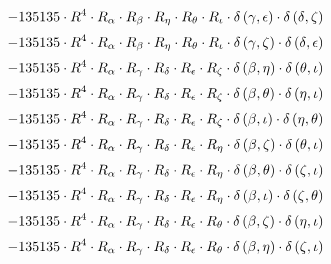 \begin{subequations}
\begin{gather}
 \\[0.2em] \notag 		 - 135135 \cdot R^{4} \cdot R_{\alpha{}} \cdot R_{\beta{}} \cdot R_{\eta{}} \cdot R_{\theta{}} \cdot R_{\iota{}} \cdot \delta{}\left(\gamma{}, \epsilon{}\right) \cdot \delta{}\left(\delta{}, \zeta{}\right) 
 \\[0.2em] \notag 		 - 135135 \cdot R^{4} \cdot R_{\alpha{}} \cdot R_{\beta{}} \cdot R_{\eta{}} \cdot R_{\theta{}} \cdot R_{\iota{}} \cdot \delta{}\left(\gamma{}, \zeta{}\right) \cdot \delta{}\left(\delta{}, \epsilon{}\right) 
 \\[0.2em] \notag 		 - 135135 \cdot R^{4} \cdot R_{\alpha{}} \cdot R_{\gamma{}} \cdot R_{\delta{}} \cdot R_{\epsilon{}} \cdot R_{\zeta{}} \cdot \delta{}\left(\beta{}, \eta{}\right) \cdot \delta{}\left(\theta{}, \iota{}\right) 
 \\[0.2em] \notag 		 - 135135 \cdot R^{4} \cdot R_{\alpha{}} \cdot R_{\gamma{}} \cdot R_{\delta{}} \cdot R_{\epsilon{}} \cdot R_{\zeta{}} \cdot \delta{}\left(\beta{}, \theta{}\right) \cdot \delta{}\left(\eta{}, \iota{}\right) 
 \\[0.2em] \notag 		 - 135135 \cdot R^{4} \cdot R_{\alpha{}} \cdot R_{\gamma{}} \cdot R_{\delta{}} \cdot R_{\epsilon{}} \cdot R_{\zeta{}} \cdot \delta{}\left(\beta{}, \iota{}\right) \cdot \delta{}\left(\eta{}, \theta{}\right) 
 \\[0.2em] \notag 		 - 135135 \cdot R^{4} \cdot R_{\alpha{}} \cdot R_{\gamma{}} \cdot R_{\delta{}} \cdot R_{\epsilon{}} \cdot R_{\eta{}} \cdot \delta{}\left(\beta{}, \zeta{}\right) \cdot \delta{}\left(\theta{}, \iota{}\right) 
 \\[0.2em] \notag 		 - 135135 \cdot R^{4} \cdot R_{\alpha{}} \cdot R_{\gamma{}} \cdot R_{\delta{}} \cdot R_{\epsilon{}} \cdot R_{\eta{}} \cdot \delta{}\left(\beta{}, \theta{}\right) \cdot \delta{}\left(\zeta{}, \iota{}\right) 
 \\[0.2em] \notag 		 - 135135 \cdot R^{4} \cdot R_{\alpha{}} \cdot R_{\gamma{}} \cdot R_{\delta{}} \cdot R_{\epsilon{}} \cdot R_{\eta{}} \cdot \delta{}\left(\beta{}, \iota{}\right) \cdot \delta{}\left(\zeta{}, \theta{}\right) 
 \\[0.2em] \notag 		 - 135135 \cdot R^{4} \cdot R_{\alpha{}} \cdot R_{\gamma{}} \cdot R_{\delta{}} \cdot R_{\epsilon{}} \cdot R_{\theta{}} \cdot \delta{}\left(\beta{}, \zeta{}\right) \cdot \delta{}\left(\eta{}, \iota{}\right) 
 \\[0.2em] \notag 		 - 135135 \cdot R^{4} \cdot R_{\alpha{}} \cdot R_{\gamma{}} \cdot R_{\delta{}} \cdot R_{\epsilon{}} \cdot R_{\theta{}} \cdot \delta{}\left(\beta{}, \eta{}\right) \cdot \delta{}\left(\zeta{}, \iota{}\right) 

\end{gather}
\end{subequations}
